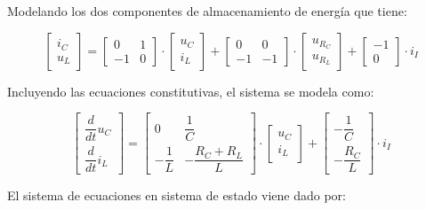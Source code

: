Modelando los dos componentes de almacenamiento de energía que tiene:

\begin{equation}
    \begin{bmatrix}
        i_C \\
        u_L
    \end{bmatrix}
    =
    \begin{bmatrix}
        0 & 1 \\
        -1 & 0
    \end{bmatrix}
    \cdot
    \begin{bmatrix}
        u_C \\
        i_L
    \end{bmatrix}
    +
    \begin{bmatrix}
        0 & 0 \\
        -1 & -1
    \end{bmatrix}
    \cdot
    \begin{bmatrix}
        u_{R_C} \\
        u_{R_L}
    \end{bmatrix}
    +
    \begin{bmatrix}
        -1 \\
        0
    \end{bmatrix}
    \cdot
    i_I
\end{equation}

Incluyendo las ecuaciones constitutivas, el sistema se modela como:

\begin{equation}
    \begin{bmatrix}
        \dfrac{d}{dt}u_C\\
        \dfrac{d}{dt}i_L
    \end{bmatrix}
    =
    \begin{bmatrix}
        0 & \dfrac{1}{C}\\
        -\dfrac{1}{L} & -\dfrac{R_C + R_L}{L}
    \end{bmatrix}
    \cdot
    \begin{bmatrix}
        u_C\\
        i_L
    \end{bmatrix}
    +
    \begin{bmatrix}
        -\dfrac{1}{C}\\
        -\dfrac{R_C}{L}
    \end{bmatrix}
    \cdot
   i_I 
\end{equation}

El sistema de ecuaciones en sistema de estado viene dado por:

